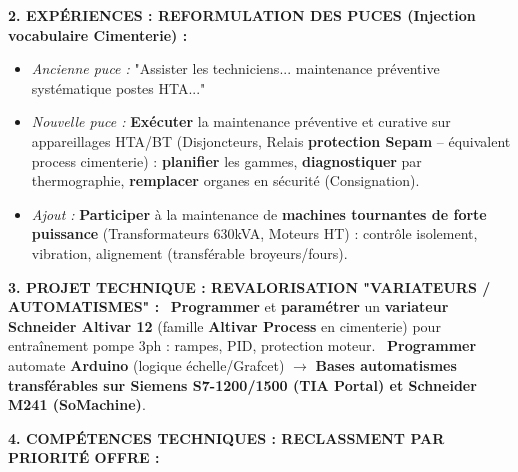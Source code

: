 \documentclass[11pt]{article}
\begin{document}
\begin{exoresolu}
\medskip
\noindent \textbf{2. EXPÉRIENCES : REFORMULATION DES PUCES (Injection vocabulaire Cimenterie) :}
\begin{itemize}
    \item \emph{Ancienne puce :} "Assister les techniciens... maintenance préventive systématique postes HTA..."
    \item \emph{Nouvelle puce :} \textbf{Exécuter} la maintenance préventive et curative sur appareillages HTA/BT (Disjoncteurs, Relais \textbf{protection Sepam} -- équivalent process cimenterie) : \textbf{planifier} les gammes, \textbf{diagnostiquer} par thermographie, \textbf{remplacer} organes en sécurité (Consignation).
    \item \emph{Ajout :} \textbf{Participer} à la maintenance de \textbf{machines tournantes de forte puissance} (Transformateurs 630kVA, Moteurs HT) : contrôle isolement, vibration, alignement (transférable broyeurs/fours).
\end{itemize}

\medskip
\noindent \textbf{3. PROJET TECHNIQUE : REVALORISATION "VARIATEURS / AUTOMATISMES" :}
\textbullet\ \textbf{Programmer} et \textbf{paramétrer} un \textbf{variateur Schneider Altivar 12} (famille \textbf{Altivar Process} en cimenterie) pour entraînement pompe 3ph : rampes, PID, protection moteur.
\textbullet\ \textbf{Programmer} automate \textbf{Arduino} (logique échelle/Grafcet) $\rightarrow$ \textbf{Bases automatismes transférables sur Siemens S7-1200/1500 (TIA Portal) et Schneider M241 (SoMachine)}.

\medskip
\noindent \textbf{4. COMPÉTENCES TECHNIQUES : RECLASSMENT PAR PRIORITÉ OFFRE :}


\end{exoresolu}
\end{document}
